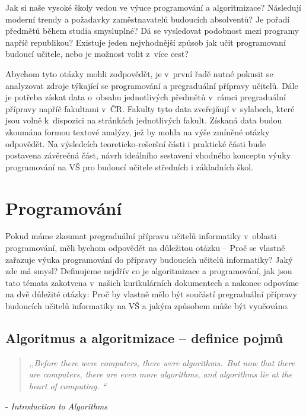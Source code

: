 \documentclass[FP,DP]{tulthesis}
\newcommand{\ahoj}[2]{\begin{quotation} \textit{#1} \end{quotation} \begin{flushright} - \textit{#2}\end{flushright} }
\begin{document}
Jak si naše vysoké školy vedou ve výuce programování a algoritmizace? Následují moderní trendy a požadavky zaměstnavatelů budoucích absolventů? Je pořadí předmětů během studia smysluplné? Dá se vysledovat podobnost mezi programy napříč republikou? Existuje  jeden nejvhodnější způsob jak učit programovaní budoucí učitele, nebo je možnost volit z~více cest?

 Abychom tyto otázky mohli zodpovědět, je v~první řadě nutné pokusit se analyzovat zdroje týkající se programování a pregraduální přípravy učitelů. Dále je potřeba získat data o~obsahu jednotlivých předmětů v~rámci pregraduální přípravy napříč fakultami v~ČR. Fakulty tyto data zveřejňují v~sylabech, které jsou volně k~dispozici na stránkách jednotlivých fakult. Získaná data budou zkoumána formou textové analýzy, jež by mohla na výše zmíněné otázky odpovědět. Na výsledcích teoreticko-rešeršní části i praktické části bude postavena závěrečná část, návrh ideálního sestavení vhodného konceptu výuky programování na VŠ pro budoucí učitele středních i základních škol.
\clearpage
\listoftodos
\chapter{Programování}
Pokud máme zkoumat pregraduální přípravu učitelů informatiky v~oblasti programování, měli bychom odpovědět na důležitou otázku -- Proč se vlastně zařazuje výuka programování do přípravy budoucích učitelů informatiky? Jaký zde má smysl? Definujeme nejdřív co je algoritmizace a programování, jak jsou tato témata zakotvena v~našich kurikulárních dokumentech a nakonec odpovíme na dvě důležité otázky: Proč by vlastně mělo být součástí pregraduální přípravy budoucích učitelů informatiky na VŠ a jakým způsobem může být vyučováno.
\section{Algoritmus a algoritmizace -- definice pojmů}
\ahoj{,,Before there were computers, there were algorithms.~But now that there are computers,
there are even more algorithms, and algorithms lie at the heart of computing. ``}{Introduction to Algorithms}
\end{document}
